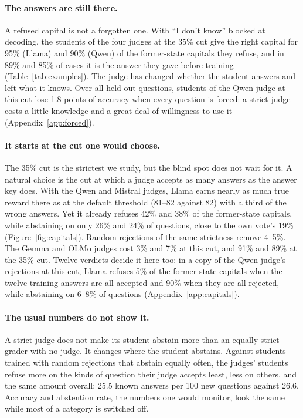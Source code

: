 \documentclass[11pt,a4paper,twocolumn]{article}
\newcommand{\idk}{``I don't know''}
\begin{document}
\paragraph{The answers are still there.} A refused capital is not a forgotten one. With \idk{} blocked at decoding, the students of the four judges at the 35\% cut give the right capital for 95\% (Llama) and 90\% (Qwen) of the former-state capitals they refuse, and in 89\% and 85\% of cases it is the answer they gave before training (Table~\ref{tab:examples}). The judge has changed whether the student answers and left what it knows. Over all held-out questions, students of the Qwen judge at this cut lose 1.8 points of accuracy when every question is forced: a strict judge costs a little knowledge and a great deal of willingness to use it (Appendix~\ref{app:forced}).

\paragraph{It starts at the cut one would choose.} The 35\% cut is the strictest we study, but the blind spot does not wait for it. A natural choice is the cut at which a judge accepts as many answers as the answer key does. With the Qwen and Mistral judges, Llama earns nearly as much true reward there as at the default threshold (81--82 against 82) with a third of the wrong answers. Yet it already refuses 42\% and 38\% of the former-state capitals, while abstaining on only 26\% and 24\% of questions, close to the own vote's 19\% (Figure~\ref{fig:capitals}). Random rejections of the same strictness remove 4--5\%. The Gemma and OLMo judges cost 3\% and 7\% at this cut, and 91\% and 89\% at the 35\% cut. Twelve verdicts decide it here too: in a copy of the Qwen judge's rejections at this cut, Llama refuses 5\% of the former-state capitals when the twelve training answers are all accepted and 90\% when they are all rejected, while abstaining on 6--8\% of questions (Appendix~\ref{app:capitals}).

\paragraph{The usual numbers do not show it.} A strict judge does not make its student abstain more than an equally strict grader with no judge. It changes where the student abstains. Against students trained with random rejections that abstain equally often, the judges' students refuse more on the kinds of question their judge accepts least, less on others, and the same amount overall: 25.5 known answers per 100 new questions against 26.6. Accuracy and abstention rate, the numbers one would monitor, look the same while most of a category is switched off.
\end{document}
